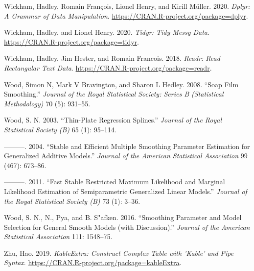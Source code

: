 \documentclass[conference,final,]{IEEEtran}
\newlength{\cslhangindent}
\newenvironment{cslreferences}%
  {\setlength{\parindent}{0pt}%
  \everypar{\setlength{\hangindent}{\cslhangindent}}\ignorespaces}%
  {\par}
\begin{document}
\begin{cslreferences}
\leavevmode\hypertarget{ref-R-dplyr}{}%
Wickham, Hadley, Romain François, Lionel Henry, and Kirill Müller. 2020. \emph{Dplyr: A Grammar of Data Manipulation}. \url{https://CRAN.R-project.org/package=dplyr}.

\leavevmode\hypertarget{ref-R-tidyr}{}%
Wickham, Hadley, and Lionel Henry. 2020. \emph{Tidyr: Tidy Messy Data}. \url{https://CRAN.R-project.org/package=tidyr}.

\leavevmode\hypertarget{ref-R-readr}{}%
Wickham, Hadley, Jim Hester, and Romain Francois. 2018. \emph{Readr: Read Rectangular Text Data}. \url{https://CRAN.R-project.org/package=readr}.

\leavevmode\hypertarget{ref-wood2008soap}{}%
Wood, Simon N, Mark V Bravington, and Sharon L Hedley. 2008. ``Soap Film Smoothing.'' \emph{Journal of the Royal Statistical Society: Series B (Statistical Methodology)} 70 (5): 931--55.

\leavevmode\hypertarget{ref-R-mgcv_d}{}%
Wood, S. N. 2003. ``Thin-Plate Regression Splines.'' \emph{Journal of the Royal Statistical Society (B)} 65 (1): 95--114.

\leavevmode\hypertarget{ref-R-mgcv_c}{}%
---------. 2004. ``Stable and Efficient Multiple Smoothing Parameter Estimation for Generalized Additive Models.'' \emph{Journal of the American Statistical Association} 99 (467): 673--86.

\leavevmode\hypertarget{ref-R-mgcv_a}{}%
---------. 2011. ``Fast Stable Restricted Maximum Likelihood and Marginal Likelihood Estimation of Semiparametric Generalized Linear Models.'' \emph{Journal of the Royal Statistical Society (B)} 73 (1): 3--36.

\leavevmode\hypertarget{ref-R-mgcv_b}{}%
Wood, S. N., N., Pya, and B. S"afken. 2016. ``Smoothing Parameter and Model Selection for General Smooth Models (with Discussion).'' \emph{Journal of the American Statistical Association} 111: 1548--75.

\leavevmode\hypertarget{ref-R-kableExtra}{}%
Zhu, Hao. 2019. \emph{KableExtra: Construct Complex Table with 'Kable' and Pipe Syntax}. \url{https://CRAN.R-project.org/package=kableExtra}.
\end{cslreferences}
\end{document}

